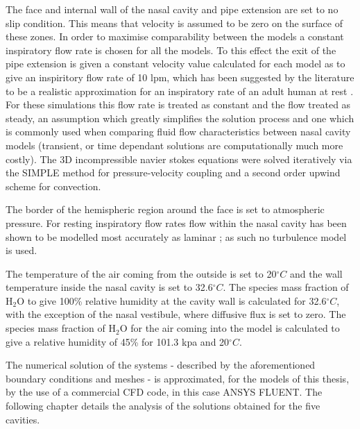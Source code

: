The face and internal wall of the nasal cavity and pipe extension are set to no slip condition. This means that velocity is assumed to be zero on the surface of these zones. In order to maximise comparability between the models a constant inspiratory flow rate is chosen for all the models. To this effect the exit of the pipe extension is given a constant velocity value calculated for each model as to give an inspiritory flow rate of 10 lpm, which has been suggested by the literature to be a realistic approximation for an inspiratory rate of an adult human at rest \cite{Wen2008, Subraniam1998}. For these simulations this flow rate is treated as constant and the flow treated as steady, an assumption which greatly simplifies the solution process and one which is commonly used when comparing fluid flow characteristics between nasal cavity models (transient, or time dependant solutions are computationally much more costly). The 3D incompressible navier stokes equations were solved iteratively via the SIMPLE method for pressure-velocity coupling and a second order upwind scheme for convection.

The border of the hemispheric region around the face is set to atmospheric pressure. For resting inspiratory flow rates flow within the nasal cavity has been shown to be modelled most accurately as laminar \cite{Doorly2008, Hahn1993}; as such no turbulence model is used.

The temperature of the air coming from the outside is set to 20$^{\circ} C$ and the wall temperature inside the nasal cavity is set to 32.6$^{\circ} C$.  The species mass fraction of $\mathrm{H_2 O}$ to give 100\% relative humidity at the cavity wall is calculated for 32.6$^{\circ} C$, with the exception of the nasal vestibule, where diffusive flux is set to zero. The species mass fraction of $\mathrm{H_2 O}$ for the air coming into the model is calculated to give a relative humidity of 45\% for 101.3 kpa and 20$^{\circ} C$.

The numerical solution of the systems - described by the aforementioned boundary conditions and meshes - is approximated, for the models of this thesis, by the use of a commercial CFD code, in this case ANSYS FLUENT. The following chapter details the analysis of the solutions obtained for the five cavities.
